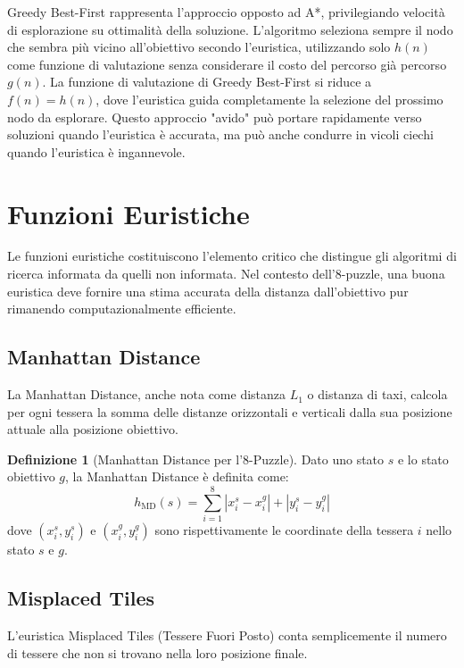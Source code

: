 \documentclass[12pt,a4paper]{report}
\theoremstyle{definition}
\newtheorem{definizione}{Definizione}[chapter]
\begin{document}
Greedy Best-First rappresenta l'approccio opposto ad A*, privilegiando velocità di esplorazione su ottimalità della soluzione. L'algoritmo seleziona sempre il nodo che sembra più vicino all'obiettivo secondo l'euristica, utilizzando solo $h(n)$ come funzione di valutazione senza considerare il costo del percorso già percorso $g(n)$. La funzione di valutazione di Greedy Best-First si riduce a $f(n) = h(n)$, dove l'euristica guida completamente la selezione del prossimo nodo da esplorare. Questo approccio "avido" può portare rapidamente verso soluzioni quando l'euristica è accurata, ma può anche condurre in vicoli ciechi quando l'euristica è ingannevole.

\section{Funzioni Euristiche}

Le funzioni euristiche costituiscono l'elemento critico che distingue gli algoritmi di ricerca informata da quelli non informata. Nel contesto dell'8-puzzle, una buona euristica deve fornire una stima accurata della distanza dall'obiettivo pur rimanendo computazionalmente efficiente.

\subsection{Manhattan Distance}

La Manhattan Distance, anche nota come distanza $L_1$ o distanza di taxi, calcola per ogni tessera la somma delle distanze orizzontali e verticali dalla sua posizione attuale alla posizione obiettivo.

\begin{definizione}[Manhattan Distance per l'8-Puzzle]
Dato uno stato $s$ e lo stato obiettivo $g$, la Manhattan Distance è definita come:
$$h_{\text{MD}}(s) = \sum_{i=1}^{8} |x_i^s - x_i^g| + |y_i^s - y_i^g|$$
dove $(x_i^s, y_i^s)$ e $(x_i^g, y_i^g)$ sono rispettivamente le coordinate della tessera $i$ nello stato $s$ e $g$.
\end{definizione}

\subsection{Misplaced Tiles}

L'euristica Misplaced Tiles (Tessere Fuori Posto) conta semplicemente il numero di tessere che non si trovano nella loro posizione finale.
\end{document}
